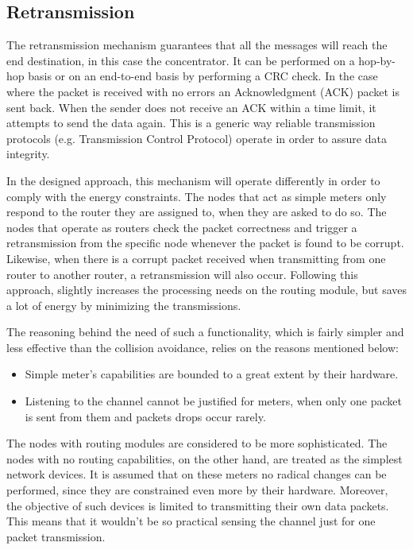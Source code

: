 \subsection{Retransmission}

The retransmission mechanism guarantees that all the messages will reach the end destination, in this case the concentrator. It can be performed on a hop-by-hop basis or on an end-to-end basis by performing a CRC check. In the case where the packet is received with no errors an Acknowledgment (ACK) packet is sent back. When the sender does not receive an ACK within a time limit, it attempts to send the data again. This is a generic way reliable transmission protocols (e.g. Transmission Control Protocol) operate in order to assure data integrity. 

In the designed approach, this mechanism will operate differently in order to comply with the energy constraints. The nodes that act as simple meters only respond to the router they are assigned to, when they are asked to do so. The nodes that operate as routers check the packet correctness and trigger a retransmission from the specific node whenever the packet is found to be corrupt. Likewise, when there is a corrupt packet received when transmitting from one router to another router, a retransmission will also occur. Following this approach, slightly increases the processing needs on the routing module, but saves a lot of energy by minimizing the transmissions.

The reasoning behind the need of such a functionality, which is fairly simpler and less effective than the collision avoidance, relies on the reasons mentioned below:

\begin{itemize}
\item Simple meter's capabilities are bounded to a great extent by their hardware.
\item Listening to the channel cannot be justified for meters, when only one packet is sent from them and packets drops occur rarely.
\end{itemize}
The nodes with routing modules are considered to be more sophisticated. The nodes with no routing capabilities, on the other hand, are treated as the simplest network devices. It is assumed that on these meters no radical changes can be performed, since they are constrained even more by their hardware. Moreover, the objective of such devices is limited to transmitting their own data packets. This means that it wouldn't be so practical sensing the channel just for one packet transmission.


